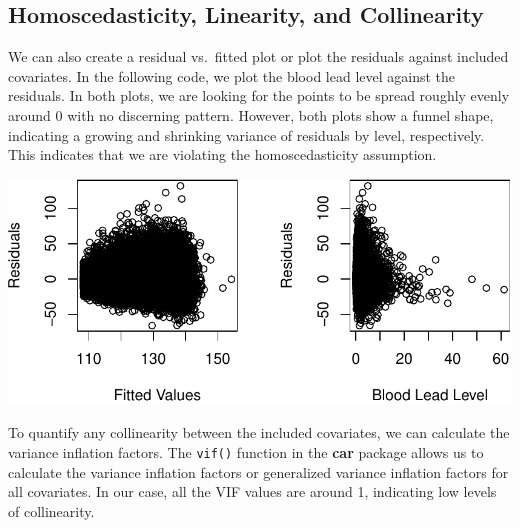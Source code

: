 \documentclass[
  letterpaper,
]{latex/krantz}
\makeatletter
\newenvironment{Shaded}{\begin{snugshade}}{\end{snugshade}}
\newcommand{\AttributeTok}[1]{\textcolor[rgb]{0.40,0.45,0.13}{#1}}
\newcommand{\DecValTok}[1]{\textcolor[rgb]{0.68,0.00,0.00}{#1}}
\newcommand{\FunctionTok}[1]{\textcolor[rgb]{0.28,0.35,0.67}{#1}}
\newcommand{\NormalTok}[1]{\textcolor[rgb]{0.00,0.23,0.31}{#1}}
\newcommand{\SpecialCharTok}[1]{\textcolor[rgb]{0.37,0.37,0.37}{#1}}
\newcommand{\StringTok}[1]{\textcolor[rgb]{0.13,0.47,0.30}{#1}}
\newenvironment{kframe}{%
\medskip{}
\setlength{\fboxsep}{.8em}
 \def\at@end@of@kframe{}%
 \ifinner\ifhmode%
  \def\at@end@of@kframe{\end{minipage}}%
  \begin{minipage}{\columnwidth}%
 \fi\fi%
 \def\FrameCommand##1{\hskip\@totalleftmargin \hskip-\fboxsep
 \colorbox{shadecolor}{##1}\hskip-\fboxsep
     \hskip-\linewidth \hskip-\@totalleftmargin \hskip\columnwidth}%
 \MakeFramed {\advance\hsize-\width
   \@totalleftmargin\z@ \linewidth\hsize
   \@setminipage}}%
 {\par\unskip\endMakeFramed%
 \at@end@of@kframe}
\renewenvironment{Shaded}{\begin{kframe}}{\end{kframe}}
\makeatother
\begin{document}
\subsection{Homoscedasticity, Linearity, and
Collinearity}\label{homoscedasticity-linearity-and-collinearity}

We can also create a residual vs.~fitted plot or plot the residuals
against included covariates. In the following code, we plot the blood
lead level against the residuals. In both plots, we are looking for the
points to be spread roughly evenly around 0 with no discerning pattern.
However, both plots show a funnel shape, indicating a growing and
shrinking variance of residuals by level, respectively. This indicates
that we are violating the homoscedasticity assumption.

\begin{Shaded}
\end{Shaded}

\begin{center}
\includegraphics[width=1\textwidth,height=\textheight]{book/linear_regression_files/figure-pdf/unnamed-chunk-19-1.pdf}
\end{center}

To quantify any collinearity between the included covariates, we can
calculate the variance inflation factors. The
\texttt{vif()} function in the
\textbf{car} package allows us to calculate the
variance inflation factors or generalized variance inflation factors for
all covariates. In our case, all the VIF values are around 1, indicating
low levels of collinearity.
\end{document}
